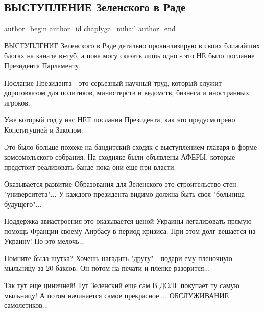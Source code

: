  
 
 
 
 
 
\subsection{ВЫСТУПЛЕНИЕ Зеленского в Раде}
\label{sec:01_12_2021.fb.chaplyga_mihail.1.vystuplenie_zelenskii_rada}
 
\ifcmt
 author_begin
   author_id chaplyga_mihail
 author_end
\fi

ВЫСТУПЛЕНИЕ Зеленского в Раде детально проанализирую в своих ближайших блогах
на канале ю-туб, а пока могу сказать лишь одно - это НЕ было послание
Президента Парламенту.

Послание Президента - это серьезный научный труд, который служит дороговказом
для политиков, министерств и ведомств, бизнеса и иностранных игроков.

Уже который год у нас НЕТ послания Президента, как это предусмотрено
Конституцией и Законом.

Это было больше похоже на бандитский сходяк с выступлением главаря в форме
комсомольского собрания. На сходняке были объявлены АФЕРЫ, которые предстоит
реализовать банде пока они еще при власти.

Оказывается развитие Образования для Зеленского это строительство стен
"университета"... У каждого президента видимо должна быть своя "больница
будущего"... 

Поддержка авиастроения это оказывается ценой Украины легализовать прямую помощь
Франции своему Аирбасу в период кризиса. При этом долг вешается на Украину! Но
это мелочь...

Помните была шутка? Хочешь нагадить "другу" - подари ему пленочную мыльницу за
20 баксов. Он потом на печати и пленке разорится... 

Так тут еще циничней! Тут Зеленский еще сам В ДОЛГ покупает ту самую мыльницу!
А потом начинается самое прекрасное.... ОБСЛУЖИВАНИЕ самолетиков... 

